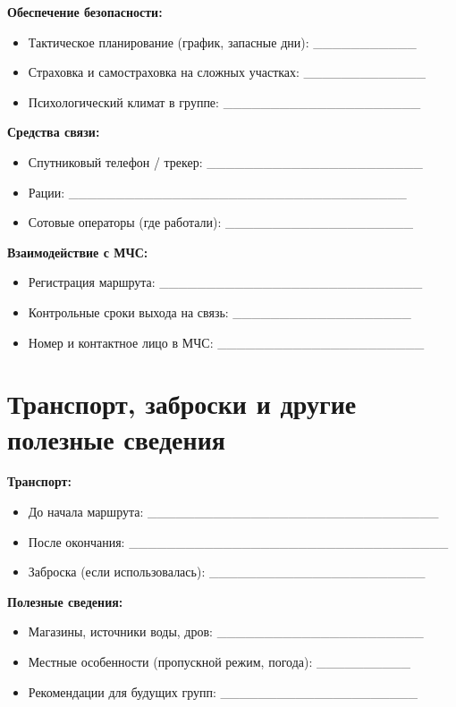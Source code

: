 \textbf{Обеспечение безопасности:}
\begin{itemize}
    \item Тактическое планирование (график, запасные дни): \_\_\_\_\_\_\_\_\_\_\_
    \item Страховка и самостраховка на сложных участках: \_\_\_\_\_\_\_\_\_\_\_\_\_
    \item Психологический климат в группе: \_\_\_\_\_\_\_\_\_\_\_\_\_\_\_\_\_\_\_\_\_
\end{itemize}

\textbf{Средства связи:}
\begin{itemize}
    \item Спутниковый телефон / трекер: \_\_\_\_\_\_\_\_\_\_\_\_\_\_\_\_\_\_\_\_\_\_\_
    \item Рации: \_\_\_\_\_\_\_\_\_\_\_\_\_\_\_\_\_\_\_\_\_\_\_\_\_\_\_\_\_\_\_\_\_\_\_\_
    \item Сотовые операторы (где работали): \_\_\_\_\_\_\_\_\_\_\_\_\_\_\_\_\_\_\_\_
\end{itemize}

\textbf{Взаимодействие с МЧС:}
\begin{itemize}
    \item Регистрация маршрута: \_\_\_\_\_\_\_\_\_\_\_\_\_\_\_\_\_\_\_\_\_\_\_\_\_\_\_\_
    \item Контрольные сроки выхода на связь: \_\_\_\_\_\_\_\_\_\_\_\_\_\_\_\_\_\_\_
    \item Номер и контактное лицо в МЧС: \_\_\_\_\_\_\_\_\_\_\_\_\_\_\_\_\_\_\_\_\_\_
\end{itemize}

\section{Транспорт, заброски и другие полезные сведения}

\textbf{Транспорт:}
\begin{itemize}
    \item До начала маршрута: \_\_\_\_\_\_\_\_\_\_\_\_\_\_\_\_\_\_\_\_\_\_\_\_\_\_\_\_\_\_\_
    \item После окончания: \_\_\_\_\_\_\_\_\_\_\_\_\_\_\_\_\_\_\_\_\_\_\_\_\_\_\_\_\_\_\_\_\_\_
    \item Заброска (если использовалась): \_\_\_\_\_\_\_\_\_\_\_\_\_\_\_\_\_\_\_\_\_\_\_
\end{itemize}

\textbf{Полезные сведения:}
\begin{itemize}
    \item Магазины, источники воды, дров: \_\_\_\_\_\_\_\_\_\_\_\_\_\_\_\_\_\_\_\_\_\_
    \item Местные особенности (пропускной режим, погода): \_\_\_\_\_\_\_\_\_\_
    \item Рекомендации для будущих групп: \_\_\_\_\_\_\_\_\_\_\_\_\_\_\_\_\_\_\_\_\_
\end{itemize}